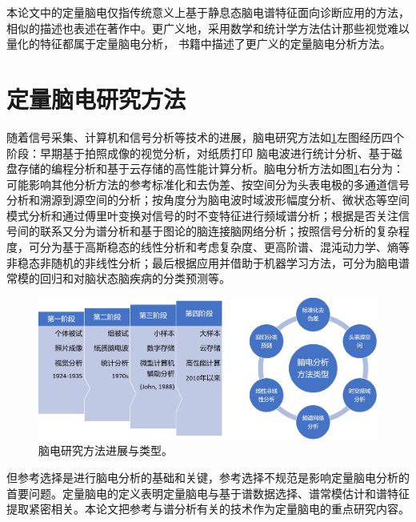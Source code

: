本论文中的定量脑电仅指传统意义上基于静息态脑电谱特征面向诊断应用的方法，相似的描述也表述在著作\cite{kropotov2010quantitative,evans1999introduction,nuwer1988quantitative}中。更广义地，采用数学和统计学方法估计那些视觉难以量化的特征都属于定量脑电分析，
书籍\cite{tong2009quantitative,majumdar2017brief}中描述了更广义的定量脑电分析方法。

\section{定量脑电研究方法}
随着信号采集、计算机和信号分析等技术的进展，脑电研究方法如\ref{1:evol}左图经历四个阶段：早期基于拍照成像的视觉分析，对纸质打印
脑电波进行统计分析、基于磁盘存储的编程分析和基于云存储的高性能计算分析。脑电分析方法如图\ref{1:evol}右分为：可能影响其他分析方法的参考标准化和去伪差、按空间分为头表电极的多通道信号分析和溯源到源空间的分析；按角度分为脑电波时域波形幅度分析、微状态等空间模式分析和通过傅里叶变换对信号的时不变特征进行频域谱分析；根据是否关注信号间的联系又分为谱分析和基于图论的脑连接脑网络分析；按照信号分析的复杂程度，可分为基于高斯稳态的线性分析和考虑复杂度、更高阶谱、混沌动力学、熵等非稳态非随机的非线性分析；最后根据应用并借助于机器学习方法，可分为脑电谱常模的回归和对脑状态脑疾病的分类预测等。
\begin{figure}[!h]
	\includegraphics[width=15cm]{pic/xulun/evolution.png}
	\caption{脑电研究方法进展与类型。}
	\label{1:evol}
\end{figure}

但参考选择是进行脑电分析的基础和关键，参考选择不规范是影响定量脑电分析的首要问题。定量脑电的定义表明定量脑电与基于谱数据选择、谱常模估计和谱特征提取紧密相关。本论文把参考与谱分析有关的技术作为定量脑电的重点研究内容。

